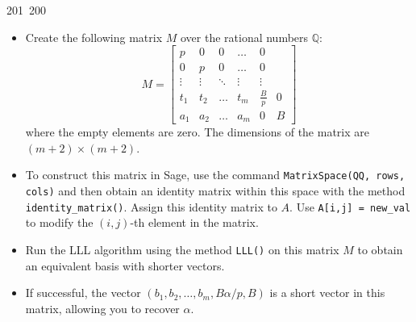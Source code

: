 201~200~\documentclass{article}
\begin{document}
	                                                                \begin{itemize}
	                                                                    \item Create the following matrix $M$ over the rational numbers $\mathbb{Q}$:
	                                                                        \[
	                                                                        	    M = \begin{bmatrix}
	                                                                        	        p & 0 & 0 & \dots & 0 \\
	                                                                        	            0 & p & 0 & \dots & 0 \\
	                                                                        	                \vdots & \vdots & \ddots & \vdots & \vdots \\
	                                                                        	                    t_1 & t_2 & \dots & t_m & \frac{B}{p} & 0 \\
	                                                                        	                        a_1 & a_2 & \dots & a_m & 0 & B
	                                                                        	                            \end{bmatrix}
	                                                                        	                                \]
	                                                                        	                                    where the empty elements are zero. The dimensions of the matrix are $(m+2) \times (m+2)$.

	                                                                        	                                        \item To construct this matrix in Sage, use the command \texttt{MatrixSpace(QQ, rows, cols)} and then obtain an identity matrix within this space with the method \texttt{identity\_matrix()}. Assign this identity matrix to $A$. Use \texttt{A[i,j] = new\_val} to modify the $(i, j)$-th element in the matrix.

	                                                                        	                                            \item Run the LLL algorithm using the method \texttt{LLL()} on this matrix $M$ to obtain an equivalent basis with shorter vectors.

	                                                                        	                                                \item If successful, the vector $(b_1, b_2, \dots, b_m, B\alpha/p, B)$ is a short vector in this matrix, allowing you to recover $\alpha$.
	                                                                        	                                                \end{itemize}
\end{document}
